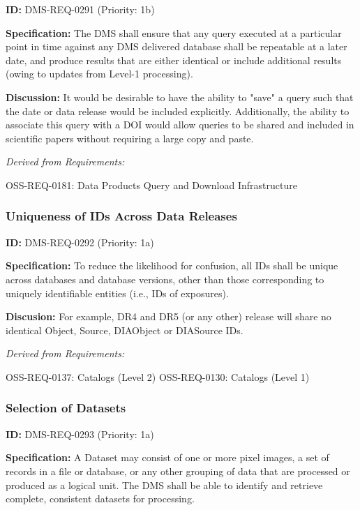 \documentclass[SE,toc,lsstdraft]{lsstdoc}
\begin{document}
\label{DMS-REQ-0291}
\textbf{ID:} DMS-REQ-0291 (Priority: 1b)

\textbf{Specification:} The DMS shall ensure that any query executed at a particular point in time against any DMS delivered database shall be repeatable at a later date, and produce results that are either identical or include additional results (owing to updates from Level-1 processing).

\textbf{Discussion:} It would be desirable to have the ability to "save" a query such that the date or data release would be included explicitly. Additionally, the ability to associate this query with a DOI would allow queries to be shared and included in scientific papers without requiring a large copy and paste.

\emph{Derived from Requirements:}

OSS-REQ-0181:
Data Products Query and Download Infrastructure \newline

\subsubsection{Uniqueness of IDs Across Data Releases}

\label{DMS-REQ-0292}
\textbf{ID:} DMS-REQ-0292 (Priority: 1a)

\textbf{Specification:} To reduce the likelihood for confusion, all IDs shall be unique across databases and database versions, other than those corresponding to uniquely identifiable entities (i.e., IDs of exposures).

\textbf{Discusion:} For example, DR4 and DR5 (or any other) release will share no identical Object, Source, DIAObject or DIASource IDs.

\emph{Derived from Requirements:}

OSS-REQ-0137:
Catalogs (Level 2) \newline
OSS-REQ-0130:
Catalogs (Level 1) \newline

\subsubsection{Selection of Datasets}

\label{DMS-REQ-0293}
\textbf{ID:} DMS-REQ-0293 (Priority: 1a)

\textbf{Specification:} A Dataset may consist of one or more pixel images, a set of records in a file or database, or any other grouping of data that are processed or produced as a logical unit. The DMS shall be able to identify and retrieve complete, consistent datasets for processing.
\end{document}
